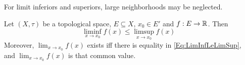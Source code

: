\documentclass[screen]{techreport}
\numberwithin{equation}{section}
\begin{document}
\begin{remark}\label{Rem:LimitInfAndSupNeglectLargeNeigh}
	For limit inferiors and superiors, large neighborhoods may be neglected.
\end{remark}

\begin{theorem}\label{The:LimInfLeLimSup}
	Let $(X,\tau)$ be a topological space, $E \subseteq X$, $x_0 \in E'$ and $f : E \to \mathbb{R}$.
	Then
	\begin{equation}
		\liminf_{x \to x_0} f(x) \le \limsup_{x \to x_0} f(x) \label{Eq:LimInfLeLimSup}
	\end{equation}
	Moreover, $\lim_{x \to x_0} f(x)$ exists iff there is equality in \eqref{Eq:LimInfLeLimSup}, and $\lim_{x \to x_0} f(x)$ is that common value.
\end{theorem}



\end{document}
